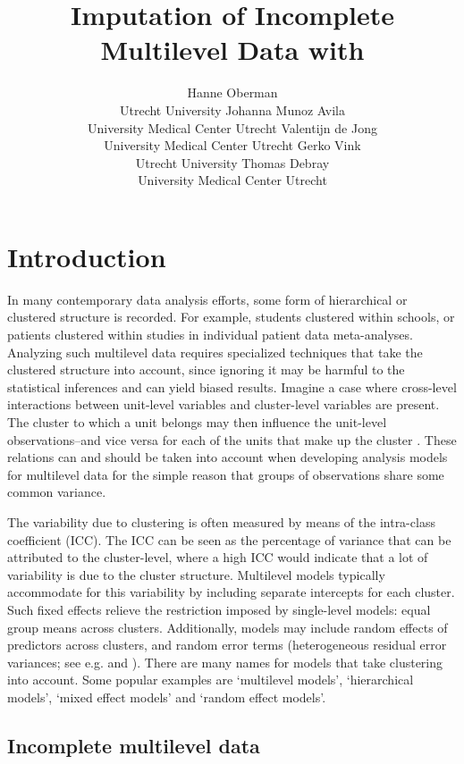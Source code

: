 \documentclass[
]{jss}
\author{
Hanne Oberman\\Utrecht University \And Johanna Munoz Avila\\University
Medical Center Utrecht \AND Valentijn de Jong\\University Medical
Center Utrecht \And Gerko Vink\\Utrecht University \AND Thomas
Debray\\University Medical Center Utrecht
}
\title{Imputation of Incomplete Multilevel Data with \pkg{mice}}
\begin{document}
\hypertarget{introduction}{%
\section{Introduction}\label{introduction}}

In many contemporary data analysis efforts, some form of hierarchical or
clustered structure is recorded. For example, students clustered within
schools, or patients clustered within studies in individual patient data
meta-analyses. Analyzing such multilevel data requires specialized
techniques that take the clustered structure into account, since
ignoring it may be harmful to the statistical inferences and can yield
biased results. Imagine a case where cross-level interactions between
unit-level variables and cluster-level variables are present. The
cluster to which a unit belongs may then influence the unit-level
observations--and vice versa for each of the units that make up the
cluster \citep{hox17}. These relations can and should be taken into
account when developing analysis models for multilevel data for the
simple reason that groups of observations share some common variance.

The variability due to clustering is often measured by means of the
intra-class coefficient (ICC). The ICC can be seen as the percentage of
variance that can be attributed to the cluster-level, where a high ICC
would indicate that a lot of variability is due to the cluster
structure. Multilevel models typically accommodate for this variability
by including separate intercepts for each cluster. Such fixed effects
relieve the restriction imposed by single-level models: equal group
means across clusters. Additionally, models may include random effects
of predictors across clusters, and random error terms (heterogeneous
residual error variances; see e.g. \citet{hox17} and \citet{jong21}).
There are many names for models that take clustering into account. Some
popular examples are `multilevel models', `hierarchical models', `mixed
effect models' and `random effect models'.

\hypertarget{incomplete-multilevel-data}{%
\subsection{Incomplete multilevel
data}\label{incomplete-multilevel-data}}
\end{document}
